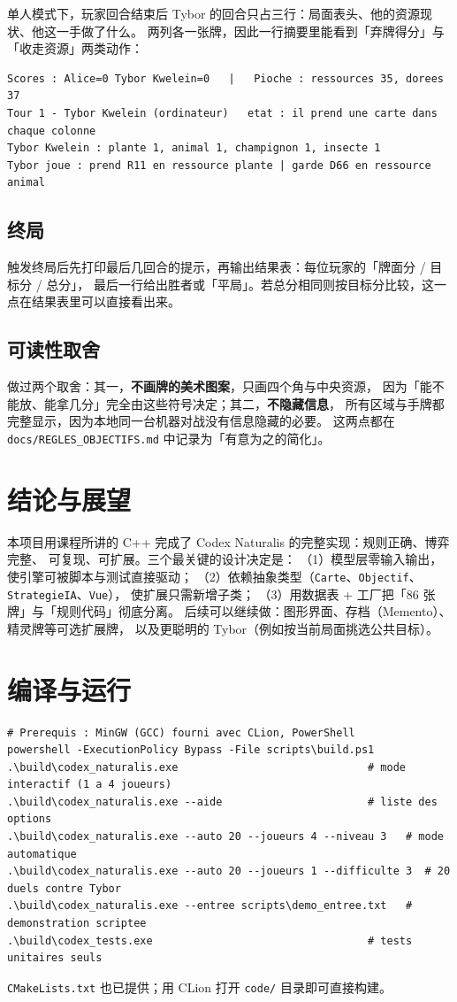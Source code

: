 \documentclass[11pt,a4paper]{ctexart}
\newcommand{\cl}[1]{\texttt{#1}}
\begin{document}
单人模式下，玩家回合结束后 Tybor 的回合只占三行：局面表头、他的资源现状、他这一手做了什么。
两列各一张牌，因此一行摘要里能看到「弃牌得分」与「收走资源」两类动作：
\begin{lstlisting}
Scores : Alice=0 Tybor Kwelein=0   |   Pioche : ressources 35, dorees 37
Tour 1 - Tybor Kwelein (ordinateur)   etat : il prend une carte dans chaque colonne
Tybor Kwelein : plante 1, animal 1, champignon 1, insecte 1
Tybor joue : prend R11 en ressource plante | garde D66 en ressource animal
\end{lstlisting}

\subsection{终局}
触发终局后先打印最后几回合的提示，再输出结果表：每位玩家的「牌面分 / 目标分 / 总分」，
最后一行给出胜者或「平局」。若总分相同则按目标分比较，这一点在结果表里可以直接看出来。

\subsection{可读性取舍}
做过两个取舍：其一，\textbf{不画牌的美术图案}，只画四个角与中央资源，
因为「能不能放、能拿几分」完全由这些符号决定；其二，\textbf{不隐藏信息}，
所有区域与手牌都完整显示，因为本地同一台机器对战没有信息隐藏的必要。
这两点都在 \cl{docs/REGLES\_OBJECTIFS.md} 中记录为「有意为之的简化」。

\section{结论与展望}
本项目用课程所讲的 C++ 完成了 Codex Naturalis 的完整实现：规则正确、博弈完整、
可复现、可扩展。三个最关键的设计决定是：
（1）模型层零输入输出，使引擎可被脚本与测试直接驱动；
（2）依赖抽象类型（\cl{Carte}、\cl{Objectif}、\cl{StrategieIA}、\cl{Vue}），
使扩展只需新增子类；
（3）用数据表 + 工厂把「86 张牌」与「规则代码」彻底分离。
后续可以继续做：图形界面、存档（Memento）、精灵牌等可选扩展牌，
以及更聪明的 Tybor（例如按当前局面挑选公共目标）。

\appendix
\section{编译与运行}
\begin{lstlisting}
# Prerequis : MinGW (GCC) fourni avec CLion, PowerShell
powershell -ExecutionPolicy Bypass -File scripts\build.ps1
.\build\codex_naturalis.exe                              # mode interactif (1 a 4 joueurs)
.\build\codex_naturalis.exe --aide                       # liste des options
.\build\codex_naturalis.exe --auto 20 --joueurs 4 --niveau 3   # mode automatique
.\build\codex_naturalis.exe --auto 20 --joueurs 1 --difficulte 3  # 20 duels contre Tybor
.\build\codex_naturalis.exe --entree scripts\demo_entree.txt   # demonstration scriptee
.\build\codex_tests.exe                                  # tests unitaires seuls
\end{lstlisting}
\cl{CMakeLists.txt} 也已提供；用 CLion 打开 \cl{code/} 目录即可直接构建。
\end{document}
